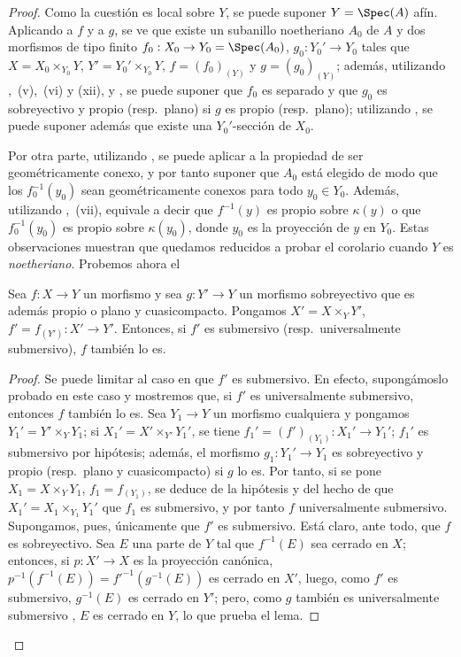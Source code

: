 \begin{proof}
Como la cuestión es local sobre $Y$, se puede suponer $Y=\Spec(A)$ afín.
Aplicando  a $f$ y a $g$, se ve que existe un subanillo noetheriano $A_0$ de $A$ y dos morfismos de tipo finito $f_0:X_0\to Y_0=\Spec(A_0)$, $g_0:Y_0'\to Y_0$ tales que $X=X_0\times_{Y_0}Y$, $Y'=Y_0'\times_{Y_0}Y$, $f=(f_0)_{(Y)}$ y $g=(g_0)_{(Y)}$; además, utilizando ,~(v),~(vi) y (xii), y , se puede suponer que $f_0$ es separado y que $g_0$ es sobreyectivo y propio (resp.\ plano) si $g$ es propio (resp.\ plano); utilizando , se puede suponer además que existe una $Y_0'$-sección de $X_0$.

Por otra parte, utilizando , se puede aplicar  a la propiedad de ser geométricamente conexo, y por tanto suponer que $A_0$ está elegido de modo que los $f_0^{-1}(y_0)$ sean geométricamente conexos para todo $y_0\in Y_0$.
Además, utilizando ,~(vii), equivale a decir que $f^{-1}(y)$ es propio sobre $\kappa(y)$ o que $f_0^{-1}(y_0)$ es propio sobre $\kappa(y_0)$, donde $y_0$ es la proyección de $y$ en $Y_0$.
Estas observaciones muestran que quedamos reducidos a probar el corolario cuando $Y$ es \emph{noetheriano}.
Probemos ahora el

\begin{lemma}[15.7.11.1]
\label{IV.15.7.11.1}
Sea $f:X\to Y$ un morfismo y sea $g:Y'\to Y$ un morfismo sobreyectivo que es además propio \textup{o} plano y cuasicompacto.
Pongamos $X'=X\times_Y Y'$, $f'=f_{(Y')}:X'\to Y'$.
Entonces, si $f'$ es submersivo \textup{(resp.\ }universalmente submersivo\textup{)}, $f$ también lo es.
\end{lemma}

\begin{proof}
Se puede limitar al caso en que $f'$ es submersivo.
En efecto, supongámoslo probado en este caso y mostremos que, si $f'$ es universalmente submersivo, entonces $f$ también lo es.
Sea $Y_1\to Y$ un morfismo cualquiera y pongamos $Y_1'=Y'\times_Y Y_1$; si $X_1'=X'\times_{Y'} Y_1'$, se tiene $f_1'=(f')_{(Y_1)}:X_1'\to Y_1'$; $f_1'$ es submersivo por hipótesis; además, el morfismo $g_1:Y_1'\to Y_1$ es sobreyectivo y propio (resp.\ plano y cuasicompacto) si $g$ lo es.
Por tanto, si se pone $X_1=X\times_Y Y_1$, $f_1=f_{(Y_1)}$, se deduce de la hipótesis y del hecho de que $X_1'=X_1\times_{Y_1} Y_1'$ que $f_1$ es submersivo, y por tanto $f$ universalmente submersivo.
Supongamos, pues, únicamente que $f'$ es submersivo.
Está claro, ante todo, que $f$ es sobreyectivo.
Sea $E$ una parte de $Y$ tal que $f^{-1}(E)$ sea cerrado en $X$; entonces, si $p:X'\to X$ es la proyección canónica,
$p^{-1}(f^{-1}(E))=f'^{-1}(g^{-1}(E))$ es cerrado en $X'$, luego, como $f'$ es submersivo, $g^{-1}(E)$ es cerrado en $Y'$; pero, como $g$ también es universalmente submersivo , $E$ es cerrado en $Y$, lo que prueba el lema.
\end{proof}


\end{proof}
